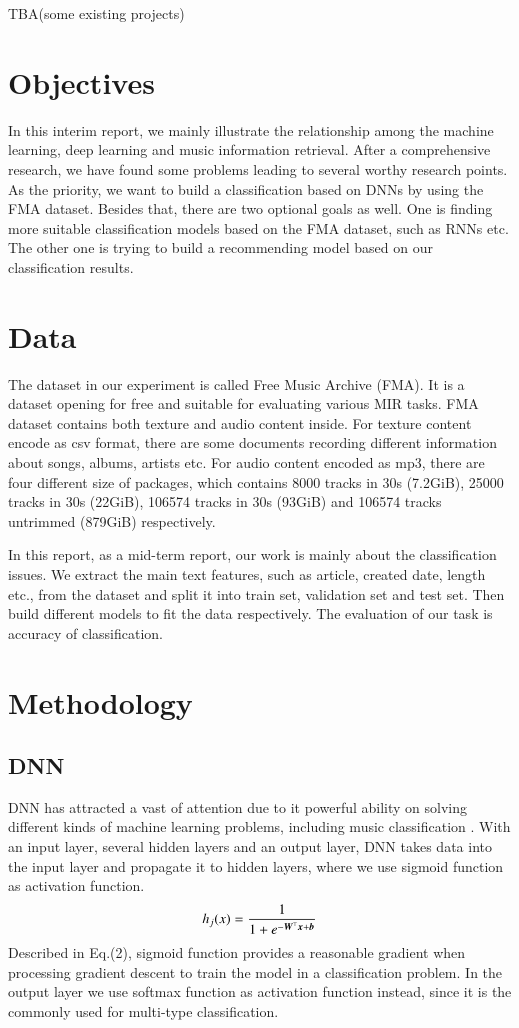 \documentclass{article}
\def\mathbi#1{\textbf{\em #1}}
\begin{document}
TBA(some existing projects)


\section{Objectives}
In this interim report, we mainly illustrate the relationship among the machine learning, deep learning and music information retrieval. After a comprehensive research, we have found some problems leading to several worthy research points. As the priority, we want to build a classification based on DNNs by using the FMA dataset. Besides that, there are two optional goals as well. One is finding more suitable classification models based on the FMA dataset, such as RNNs etc. The other one is trying to build a recommending model based on our classification results.


\section{Data}
The dataset in our experiment is called Free Music Archive (FMA). It is a dataset opening for free and suitable for evaluating various MIR tasks. FMA dataset contains both texture and audio content inside. For texture content encode as csv format, there are some documents recording different information about songs, albums, artists etc. For audio content encoded as mp3, there are four different size of packages, which contains 8000 tracks in 30s (7.2GiB), 25000 tracks in 30s (22GiB), 106574 tracks in 30s (93GiB) and 106574 tracks untrimmed (879GiB) respectively. 

In this report, as a mid-term report, our work is mainly about the classification issues. We extract the main text features, such as article, created date, length etc., from the dataset and split it into train set, validation set and test set. Then build different models to fit the data respectively. The evaluation of our task is accuracy of classification. 


\section{Methodology}
\subsection{DNN}
DNN has attracted a vast of attention due to it powerful ability on solving different kinds of machine learning problems, including music classification \cite{dai2015multilingual}. With an input layer, several hidden layers and an output layer, DNN takes data into the input layer and propagate it to hidden layers, where we use sigmoid function as activation function.
\begin{equation}
	h_ j (x) =  \frac{\mathrm{1} }{\mathrm{1} + e^{- \mathbi{W}^\top \mathbi{x} + \mathbi{b} }}
\end{equation}
Described in Eq.(2), sigmoid function provides a reasonable gradient when processing gradient descent to train the model in a classification problem. In the output layer we use softmax function as activation function instead, since it is the commonly used for multi-type classification. 
\end{document}
